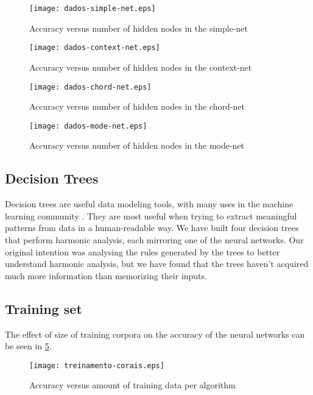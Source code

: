 \documentclass{article}
\begin{document}
\begin{figure}
  \texttt{[image: dados-simple-net.eps]}
  \caption{Accuracy versus number of hidden nodes in the simple-net}
  \label{fig:simple-net}
\end{figure}

\begin{figure}
  \texttt{[image: dados-context-net.eps]}
  \caption{Accuracy versus number of hidden nodes in the context-net}
  \label{fig:context-net}
\end{figure}

\begin{figure}
  \texttt{[image: dados-chord-net.eps]}
  \caption{Accuracy versus number of hidden nodes in the chord-net}
  \label{fig:chord-net}
\end{figure}

\begin{figure}
  \texttt{[image: dados-mode-net.eps]}
  \caption{Accuracy versus number of hidden nodes in the mode-net}
  \label{fig:mode-net}
\end{figure}

\subsection{Decision Trees}

Decision trees are useful data modeling tools, with many uses in the
machine learning community \cite{Mitchell:1997:ML}. They are most
useful when trying to extract meaningful patterns from data in a
human-readable way. We have built four decision trees that perform
harmonic analysis, each mirroring one of the neural networks. Our
original intention was analysing the rules generated by the trees to
better understand harmonic analysis, but we have found that the trees
haven't acquired much more information than memorizing their inputs.

\subsection{Training set}

The effect of size of training corpora on the accuracy of the neural
networks can be seen in \ref{fig:treinamento-corais}.

\begin{figure}
  \texttt{[image: treinamento-corais.eps]}
  \caption{Accuracy versus amount of training data per algorithm}
  \label{fig:treinamento-corais}
\end{figure}
\end{document}
